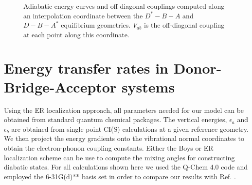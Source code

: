 \begin{figure}[!ht]
\caption{Adiabatic energy curves and off-diagonal couplings computed along an interpolation coordinate between the
$D^{*}-B-A$ and $D-B-A^{*}$ equilibrium geometries.  $V_{ab}$ is the off-diagonal coupling at each point along this coordinate.} \label{parabs}
\end{figure}





\section{Energy transfer rates in  Donor-Bridge-Acceptor systems}


Using the ER localization approach, all parameters needed for our model can be  obtained from
standard  quantum chemical packages.   The vertical energies, $\epsilon_{a}$
and $\epsilon_{b}$ are obtained from single point CI(S) calculations at a given
reference geometry.   We then project the energy gradients onto the vibrational normal
coordinates to obtain the electron-phonon coupling constants.  Either the Boys or ER
localization scheme can be use to compute the mixing
angles for constructing diabatic states. For all calculations shown here we
used the Q-Chem 4.0 \cite{QCHEM4} code and employed the 6-31G(d){*}{*} basis set
in order to compare our results  with  Ref. \cite{subotnik2010predicting}.

